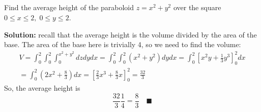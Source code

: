 \documentclass[letterpaper, 11pt]{article}
\begin{document}
\subsection{} Find the average height of the paraboloid $z =x^2 +y^2$ over the square $0 \leq x \leq 2,\; 0 \leq y \leq 2$.
\par \textbf{Solution:} recall that the average height is the volume divided by the area of the base. The area of the base here is trivially 4, so we need to find the volume:
\begin{gather*}
V = \int_0^2 \int_0^2 \int_0^{x^2 + y^2} dz dy dx = \int_0^2 \int_0^2 (x^2 + y^2) dy dx = \int_0^2 \left[x^2y + \frac{1}{3} y^3 \right]_0^2 dx \\
= \int_0^2 \left(2x^2 + \frac{8}{3} \right) dx = \left[ \frac{2}{3} x^3 + \frac{8}{3}x \right]_0^2 = \frac{32}{3} 
\end{gather*}
So, the average height is 
\[ \frac{32}{3} \frac{1}{4} = \frac{8}{3} \quad\blacksquare \]
\end{document}
